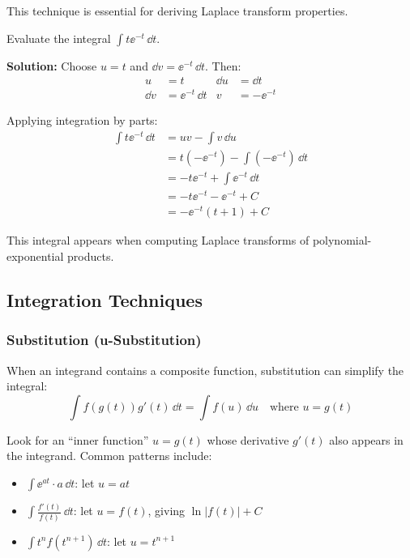 This technique is essential for deriving Laplace transform properties.

\begin{examplebox}[title=Integration by Parts]
Evaluate the integral $\displaystyle\int t \ee^{-t} \, \dd t$.

\textbf{Solution:} Choose $u = t$ and $\dd v = \ee^{-t} \, \dd t$. Then:
\begin{align}
u &= t & \dd u &= \dd t \\
\dd v &= \ee^{-t} \, \dd t & v &= -\ee^{-t}
\end{align}

Applying integration by parts:
\begin{align}
\int t \ee^{-t} \, \dd t &= uv - \int v \, \dd u \\
&= t(-\ee^{-t}) - \int (-\ee^{-t}) \, \dd t \\
&= -t\ee^{-t} + \int \ee^{-t} \, \dd t \\
&= -t\ee^{-t} - \ee^{-t} + C \\
&= -\ee^{-t}(t + 1) + C
\end{align}

This integral appears when computing Laplace transforms of polynomial-exponential products.
\end{examplebox}

\subsection{Integration Techniques}

\subsubsection{Substitution (u-Substitution)}

When an integrand contains a composite function, substitution can simplify the integral:
\begin{equation}
\int f(g(t)) g'(t) \, \dd t = \int f(u) \, \dd u \quad \text{where } u = g(t)
\end{equation}

\begin{keyconceptbox}[title=Choosing a Substitution]
Look for an ``inner function'' $u = g(t)$ whose derivative $g'(t)$ also appears in the integrand. Common patterns include:
\begin{itemize}
    \item $\int \ee^{at} \cdot a \, \dd t$: let $u = at$
    \item $\int \frac{f'(t)}{f(t)} \, \dd t$: let $u = f(t)$, giving $\ln|f(t)| + C$
    \item $\int t^n f(t^{n+1}) \, \dd t$: let $u = t^{n+1}$
\end{itemize}
\end{keyconceptbox}

